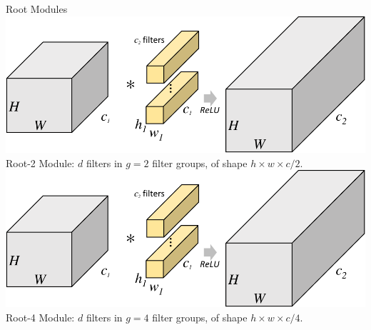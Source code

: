 \documentclass[t,xcolor=dvipsnames]{beamer}
\begin{document}

\begin{frame}{Root Modules}
\centering
\includegraphics[width=0.9\linewidth, page=5]{../Figs/PDF/groupfig}\\
Root-2 Module: $d$ filters in $g = 2$ filter groups, of shape $h\times w\times c/2$.
\includegraphics[width=0.9\linewidth, page=6]{../Figs/PDF/groupfig}\\
Root-4 Module: $d$ filters in $g = 4$ filter groups, of shape $h\times w\times c/4$.
\end{frame}
\end{document}
